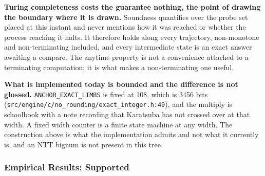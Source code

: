 \textbf{Turing completeness costs the guarantee nothing, the point of drawing the boundary where it is drawn.} Soundness quantifies over the probe set placed at this instant and never mentions how it was reached or whether the process reaching it halts. It therefore holds along every trajectory, non-monotone and non-terminating included, and every intermediate state is an exact answer awaiting a compare. The anytime property is not a convenience attached to a terminating computation; it is what makes a non-terminating one useful.

\textbf{What is implemented today is bounded and the difference is not glossed.} \texttt{ANCHOR\_EXACT\_LIMBS} is fixed at 108, which is 3456 bits (\texttt{src/\allowbreak{}engine/\allowbreak{}c/\allowbreak{}no\_rounding/\allowbreak{}exact\_integer.h:49}), and the multiply is schoolbook with a note recording that Karatsuba has not crossed over at that width. A fixed width counter is a finite state machine at any width. The construction above is what the implementation admits and not what it currently is, and an NTT bignum is not present in this tree.

\subsubsection{Empirical Results: Supported}

